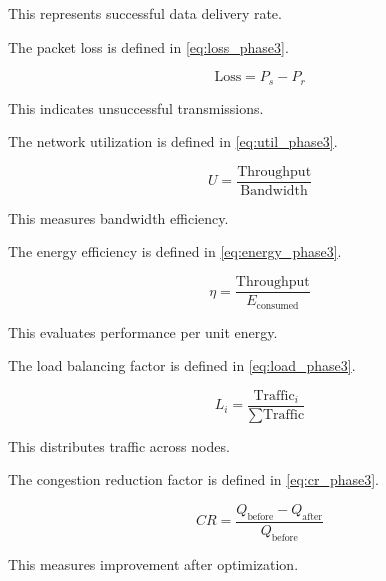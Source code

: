 \documentclass[a4paper,fleqn]{cas-dc}
\numberwithin{equation}{section}
\begin{document}
This represents successful data delivery rate.

The packet loss is defined in \ref{eq:loss_phase3}.

\begin{equation}
\text{Loss} = P_s - P_r
\label{eq:loss_phase3}
\end{equation}

This indicates unsuccessful transmissions.

The network utilization is defined in \ref{eq:util_phase3}.

\begin{equation}
U = \frac{\text{Throughput}}{\text{Bandwidth}}
\label{eq:util_phase3}
\end{equation}

This measures bandwidth efficiency.

The energy efficiency is defined in \ref{eq:energy_phase3}.

\begin{equation}
\eta = \frac{\text{Throughput}}{E_{\text{consumed}}}
\label{eq:energy_phase3}
\end{equation}

This evaluates performance per unit energy.

The load balancing factor is defined in \ref{eq:load_phase3}.

\begin{equation}
L_i = \frac{\text{Traffic}_i}{\sum \text{Traffic}}
\label{eq:load_phase3}
\end{equation}

This distributes traffic across nodes.

The congestion reduction factor is defined in \ref{eq:cr_phase3}.

\begin{equation}
CR = \frac{Q_{\text{before}} - Q_{\text{after}}}{Q_{\text{before}}}
\label{eq:cr_phase3}
\end{equation}

This measures improvement after optimization.
\end{document}
